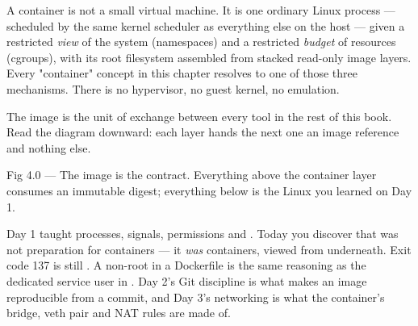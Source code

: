 \begin{keyidea}
A container is not a small virtual machine. It is one ordinary Linux process --- scheduled by the same kernel scheduler as everything else on the host --- given a restricted \emph{view} of the system (namespaces) and a restricted \emph{budget} of resources (cgroups), with its root filesystem assembled from stacked read-only image layers. Every "container" concept in this chapter resolves to one of those three mechanisms. There is no hypervisor, no guest kernel, no emulation.
\end{keyidea}

 The image is the unit of exchange between every tool in the rest of this book. Read the diagram downward: each layer hands the next one an image reference and nothing else.

\begin{wbfigure}{Fig 4.0 — The image is the contract. Everything above the container layer consumes an immutable digest; everything below is the Linux you learned on Day 1.}
\end{wbfigure}

 Day 1 taught processes, signals, permissions and . Today you discover that was not preparation for containers --- it \emph{was} containers, viewed from underneath. Exit code 137 is still . A non-root  in a Dockerfile is the same reasoning as the dedicated service user in . Day 2's Git discipline is what makes an image reproducible from a commit, and Day 3's networking is what the container's bridge, veth pair and NAT rules are made of.


